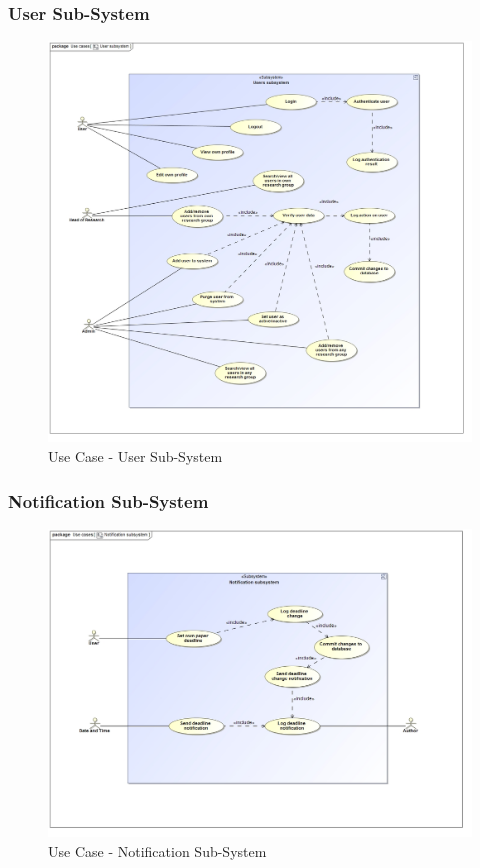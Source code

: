 \documentclass{article}
\begin{document}
			\cleardoublepage
			\subsubsection{User Sub-System}
			\begin{figure}[H]
				\includegraphics[width=\linewidth]{../Diagrams/Use Cases/User subsystem.jpg}
				\caption{Use Case - User Sub-System}
			\end{figure}
			
			\cleardoublepage
			\subsubsection{Notification Sub-System}
			\begin{figure}[H]
				\includegraphics[width=\linewidth]{../Diagrams/Use Cases/Notification subsystem.jpg}
				\caption{Use Case - Notification Sub-System}
			\end{figure}
			
\end{document}

